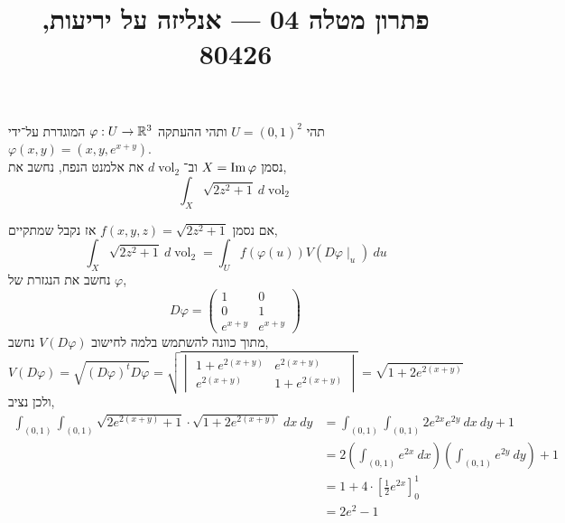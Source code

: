 
\title{פתרון מטלה 04 --- אנליזה על יריעות, 80426}

\DeclareMathOperator{\vol}{vol}


\maketitle
\maketitleprint{}

\question{}
תהי $U = {(0, 1)}^2$ ותהי ההעתקה $\varphi : U \to \mathbb{R}^3$ המוגדרת על־ידי $\varphi(x, y) = (x, y, e^{x + y})$. \\
נסמן $X = \operatorname{Im} \varphi$ וב־$d \vol_2$ את אלמנט הנפח, נחשב את,
\[
	\int_X \sqrt{2z^2 + 1}\ d\vol_2
\]
\begin{solution}
	אם נסמן $f(x, y, z) = \sqrt{2z^2 + 1}$ אז נקבל שמתקיים,
	\[
		\int_X \sqrt{2z^2 + 1}\ d\vol_2
		= \int_U f(\varphi(u)) V(D \varphi \mid_u)\ du
	\]
	נחשב את הנגזרת של $\varphi$,
	\[
		D\varphi
		= \begin{pmatrix}
			1 & 0 \\
			0 & 1 \\
			e^{x + y} & e^{x + y}
		\end{pmatrix} 
	\]
	מתוך כוונה להשתמש בלמה לחישוב $V(D \varphi)$ נחשב,
	\[
		V(D\varphi)
		= \sqrt{{(D\varphi)}^t D \varphi}
		= \sqrt{\begin{vmatrix}
				1 + e^{2 {(x + y)}} & e^{2 {(x + y)}} \\
				e^{2 {(x + y)}} & 1 + e^{2 {(x + y)}}
		\end{vmatrix}}
		= \sqrt{1 + 2e^{2 {(x + y)}}}
	\]
	ולכן נציב,
	\begin{align*}
		\int_{(0, 1)} \int_{(0, 1)} \sqrt{2 e^{2 {(x + y)}} + 1} \cdot \sqrt{1 + 2 e^{2 {(x + y)}}}\ dx\ dy
		& = \int_{(0, 1)} \int_{(0, 1)} 2 e^{2x} e^{2y}\ dx\ dy + 1 \\
		& = 2 \left( \int_{(0, 1)} e^{2x}\ dx \right) \left( \int_{(0, 1)} e^{2y}\ dy \right) + 1 \\
		& = 1 + 4 \cdot {\left[ \frac{1}{2} e^{2x} \right]}_0^1 \\
		& = 2 e^2 - 1
	\end{align*}
\end{solution}

